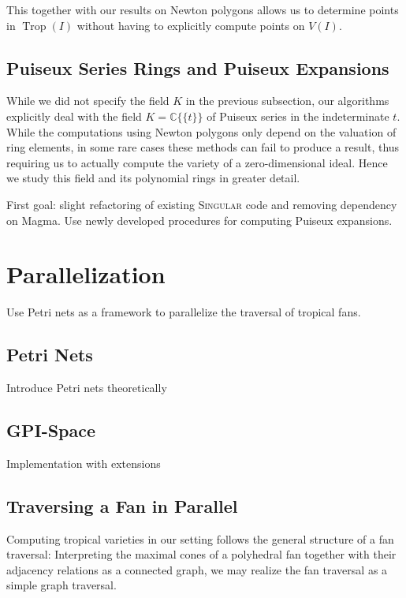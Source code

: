\documentclass[
  paper=a4,
  DIV=14,
  fontsize=12pt,
  titlepage,
  bibliography=totoc,
  listof=totoc,
  pagesize=pdftex
]{scrartcl}
\numberwithin{figure}{section}
\numberwithin{equation}{section}
\numberwithin{table}{section}
\newcommand*\setC{\mathds{C}}
\newcommand*\puiseux[2]{#1\{\!\{#2\}\!\}}
\newcommand*\CCt{\puiseux{\setC}{t}}
\DeclareMathOperator{\Trop}{Trop}
\theoremstyle{definition}
\numberwithin{definition}{section}
\begin{document}
This together with our results on Newton polygons allows us to determine points in
$\Trop(I)$ without having to explicitly compute points on $V(I)$.

\subsection{Puiseux Series Rings and Puiseux Expansions}

While we did not specify the field $K$ in the previous subsection, our algorithms
explicitly deal with the field $K = \CCt$ of Puiseux series in the indeterminate
$t$. While the computations using Newton polygons only depend on the valuation of ring
elements, in some rare cases these methods can fail to produce a result, thus requiring us
to actually compute the variety of a zero-dimensional ideal. Hence we study this field and
its polynomial rings in greater detail.

First goal: slight refactoring of existing \textsc{Singular} code and removing dependency on
Magma. Use newly developed procedures for computing Puiseux expansions.

\section{Parallelization}

Use Petri nets as a framework to parallelize the traversal of tropical fans.

\subsection{Petri Nets}

Introduce Petri nets theoretically

\subsection{GPI-Space}

Implementation with extensions

\subsection{Traversing a Fan in Parallel}

Computing tropical varieties in our setting follows the general structure of a fan
traversal: Interpreting the maximal cones of a polyhedral fan together with their
adjacency relations as a connected graph, we may realize the fan traversal as a simple
graph traversal.
\end{document}
